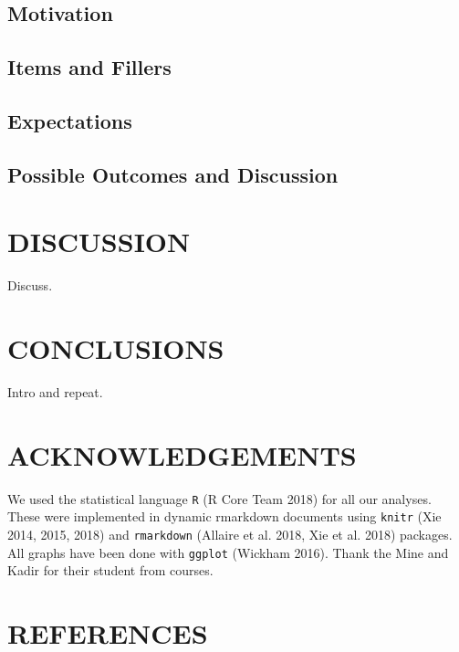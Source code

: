 \documentclass[11pt,a4paper]{article}
\begin{document}
\hypertarget{motivation}{%
\subsection{Motivation}\label{motivation}}

\hypertarget{items-and-fillers}{%
\subsection{Items and Fillers}\label{items-and-fillers}}

\hypertarget{expectations}{%
\subsection{Expectations}\label{expectations}}

\hypertarget{possible-outcomes-and-discussion}{%
\subsection{Possible Outcomes and
Discussion}\label{possible-outcomes-and-discussion}}

\hypertarget{discussion}{%
\section{DISCUSSION}\label{discussion}}

Discuss.

\hypertarget{conclusions}{%
\section{CONCLUSIONS}\label{conclusions}}

Intro and repeat.

\hypertarget{acknowledgements}{%
\section{ACKNOWLEDGEMENTS}\label{acknowledgements}}

We used the statistical language \texttt{R} (R Core Team 2018) for all
our analyses. These were implemented in dynamic rmarkdown documents
using \texttt{knitr} (Xie 2014, 2015, 2018) and \texttt{rmarkdown}
(Allaire et al. 2018, Xie et al. 2018) packages. All graphs have been
done with \texttt{ggplot} (Wickham 2016). Thank the Mine and Kadir for
their student from courses.

\hypertarget{references}{%
\section{REFERENCES}\label{references}}
\end{document}
